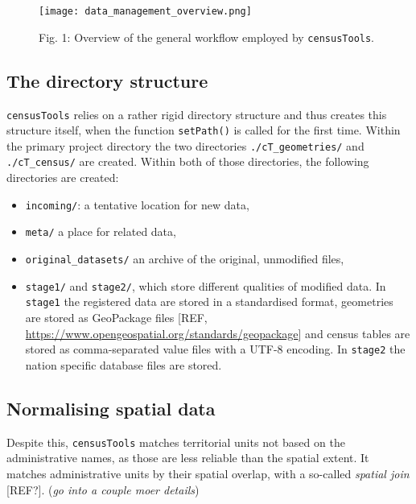 \documentclass[12pt,]{article}
\providecommand{\tightlist}{%
  \setlength{\itemsep}{0pt}\setlength{\parskip}{0pt}}
\begin{document}
\begin{figure}
\centering
\texttt{[image: data\_management\_overview.png]}
\caption{Fig. 1: Overview of the general workflow employed by \texttt{censusTools}.}
\end{figure}

\hypertarget{the-directory-structure}{%
\subsection{The directory structure}\label{the-directory-structure}}

\texttt{censusTools} relies on a rather rigid directory structure and thus creates this structure itself, when the function \texttt{setPath()} is called for the first time.
Within the primary project directory the two directories \texttt{./cT\_geometries/} and \texttt{./cT\_census/} are created.
Within both of those directories, the following directories are created:

\begin{itemize}
\tightlist
\item
  \texttt{incoming/}: a tentative location for new data,
\item
  \texttt{meta/} a place for related data,
\item
  \texttt{original\_datasets/} an archive of the original, unmodified files,
\item
  \texttt{stage1/} and \texttt{stage2/}, which store different qualities of modified data. In \texttt{stage1} the registered data are stored in a standardised format, geometries are stored as GeoPackage files {[}REF, \url{https://www.opengeospatial.org/standards/geopackage}{]} and census tables are stored as comma-separated value files with a UTF-8 encoding. In \texttt{stage2} the nation specific database files are stored.
\end{itemize}

\hypertarget{normalising-spatial-data}{%
\subsection{Normalising spatial data}\label{normalising-spatial-data}}

Despite this, \texttt{censusTools} matches territorial units not based on the administrative names, as those are less reliable than the spatial extent.
It matches administrative units by their spatial overlap, with a so-called \emph{spatial join} {[}REF?{]}. (\emph{go into a couple moer details})
\end{document}
